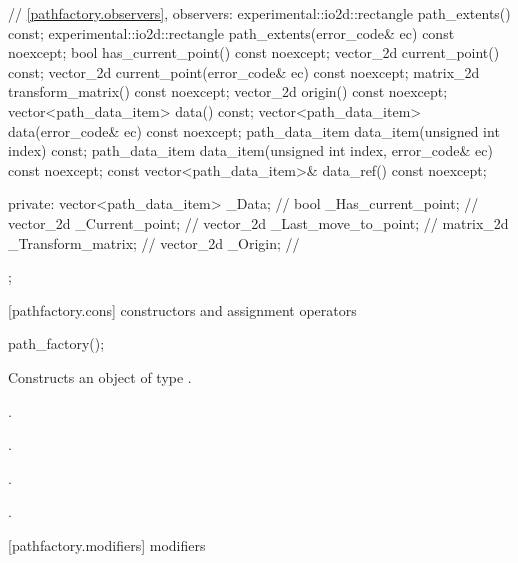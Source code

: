 \begin{codeblock}
{{{{{    // \ref{pathfactory.observers}, observers:
    experimental::io2d::rectangle path_extents() const;
    experimental::io2d::rectangle path_extents(error_code& ec) const noexcept;
    bool has_current_point() const noexcept;
    vector_2d current_point() const;
    vector_2d current_point(error_code& ec) const noexcept;
    matrix_2d transform_matrix() const noexcept;
    vector_2d origin() const noexcept;
    vector<path_data_item> data() const;
    vector<path_data_item> data(error_code& ec) const noexcept;
    path_data_item data_item(unsigned int index) const;
    path_data_item data_item(unsigned int index, error_code& ec) const noexcept;
    const vector<path_data_item>& data_ref() const noexcept;

  private:
    vector<path_data_item> _Data;  // \expos
    bool _Has_current_point;       // \expos
    vector_2d _Current_point;      // \expos
    vector_2d _Last_move_to_point; // \expos
    matrix_2d _Transform_matrix;   // \expos
    vector_2d _Origin;             // \expos
  };
} } } }
\end{codeblock}

 [pathfactory.cons] { constructors and 
assignment operators}

\begin{itemdecl}
    path_factory();
\end{itemdecl}
\begin{itemdescr}
	\pnum
	\effects
	Constructs an object of type .
	
	\pnum
	\postconditions
	.
	
	\pnum
	.
	
	\pnum
	.
	
	\pnum
	.
\end{itemdescr}

 [pathfactory.modifiers] { modifiers}

